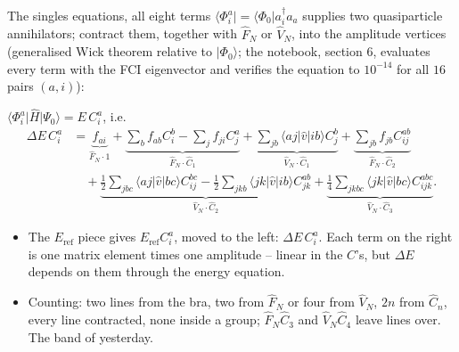 \documentclass[aspectratio=169,10pt]{beamer}
\newcommand{\ket}[1]{\vert #1\rangle}
\newcommand{\bra}[1]{\langle #1\vert}
\newcommand{\element}[3]{\langle #1\vert #2\vert #3\rangle}
\begin{document}
\begin{frame}{The singles equations, all eight terms}
  \footnotesize\vspace{-0.3em}
  $\bra{\Phi_i^a}=\bra{\Phi_0}a_i^{\dagger}a_a$ supplies two quasiparticle annihilators; contract them, together with $\hat{F}_N$ or $\hat{V}_N$, into the amplitude vertices (generalised Wick theorem relative to $\ket{\Phi_0}$; the notebook, section 6, evaluates every term with the FCI eigenvector and verifies the equation to $10^{-14}$ for all $16$ pairs $(a,i)$):
  \begin{block}{$\bra{\Phi_i^a}\hat{H}\ket{\Psi_0}=E\,C_i^a$, i.e.}
    \begin{align*}
      \Delta E\,C_i^a
      &=\underbrace{f_{ai}}_{\hat{F}_N\cdot1}
      +\underbrace{\sum_bf_{ab}C_i^b-\sum_jf_{ji}C_j^a}_{\hat{F}_N\cdot\hat{C}_1}
      +\underbrace{\sum_{jb}\element{aj}{\hat{v}}{ib}C_j^b}_{\hat{V}_N\cdot\hat{C}_1}
      +\underbrace{\sum_{jb}f_{jb}C_{ij}^{ab}}_{\hat{F}_N\cdot\hat{C}_2}\\
      &\quad+\underbrace{\frac12\sum_{jbc}\element{aj}{\hat{v}}{bc}C_{ij}^{bc}-\frac12\sum_{jkb}\element{jk}{\hat{v}}{ib}C_{jk}^{ab}}_{\hat{V}_N\cdot\hat{C}_2}
      +\underbrace{\frac14\sum_{jkbc}\element{jk}{\hat{v}}{bc}C_{ijk}^{abc}}_{\hat{V}_N\cdot\hat{C}_3}.
    \end{align*}
  \end{block}
  \begin{itemize}
    \item The $E_{\mathrm{ref}}$ piece gives $E_{\mathrm{ref}}C_i^a$, moved to the left: $\Delta E\,C_i^a$. Each term on the right is one matrix element times one amplitude -- \alert{linear} in the $C$'s, but $\Delta E$ depends on them through the energy equation.
    \item Counting: two lines from the bra, two from $\hat{F}_N$ or four from $\hat{V}_N$, $2n$ from $\hat{C}_n$, every line contracted, none inside a group; $\hat{F}_N\hat{C}_3$ and $\hat{V}_N\hat{C}_4$ leave lines over. The band of yesterday.
  \end{itemize}
\end{frame}
\end{document}
